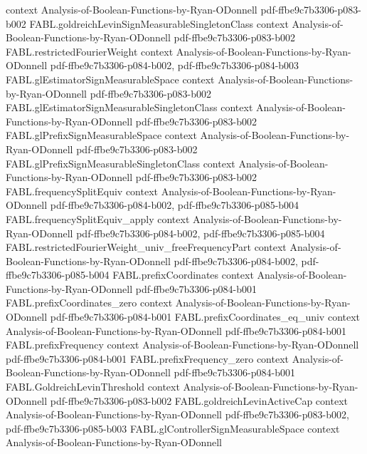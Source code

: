 \begin{theorem}
  {context}
  {Analysis-of-Boolean-Functions-by-Ryan-ODonnell}
  {pdf-ffbe9c7b3306-p083-b002}
\proofstep
  {FABL.goldreichLevinSignMeasurableSingletonClass}
  {context}
  {Analysis-of-Boolean-Functions-by-Ryan-ODonnell}
  {pdf-ffbe9c7b3306-p083-b002}
\proofstep
  {FABL.restrictedFourierWeight}
  {context}
  {Analysis-of-Boolean-Functions-by-Ryan-ODonnell}
  {pdf-ffbe9c7b3306-p084-b002,
    pdf-ffbe9c7b3306-p084-b003}
\proofstep
  {FABL.glEstimatorSignMeasurableSpace}
  {context}
  {Analysis-of-Boolean-Functions-by-Ryan-ODonnell}
  {pdf-ffbe9c7b3306-p083-b002}
\proofstep
  {FABL.glEstimatorSignMeasurableSingletonClass}
  {context}
  {Analysis-of-Boolean-Functions-by-Ryan-ODonnell}
  {pdf-ffbe9c7b3306-p083-b002}
\proofstep
  {FABL.glPrefixSignMeasurableSpace}
  {context}
  {Analysis-of-Boolean-Functions-by-Ryan-ODonnell}
  {pdf-ffbe9c7b3306-p083-b002}
\proofstep
  {FABL.glPrefixSignMeasurableSingletonClass}
  {context}
  {Analysis-of-Boolean-Functions-by-Ryan-ODonnell}
  {pdf-ffbe9c7b3306-p083-b002}
\proofstep
  {FABL.frequencySplitEquiv}
  {context}
  {Analysis-of-Boolean-Functions-by-Ryan-ODonnell}
  {pdf-ffbe9c7b3306-p084-b002,
    pdf-ffbe9c7b3306-p085-b004}
\proofstep
  {FABL.frequencySplitEquiv_apply}
  {context}
  {Analysis-of-Boolean-Functions-by-Ryan-ODonnell}
  {pdf-ffbe9c7b3306-p084-b002,
    pdf-ffbe9c7b3306-p085-b004}
\proofstep
  {FABL.restrictedFourierWeight_univ_freeFrequencyPart}
  {context}
  {Analysis-of-Boolean-Functions-by-Ryan-ODonnell}
  {pdf-ffbe9c7b3306-p084-b002,
    pdf-ffbe9c7b3306-p085-b004}
\proofstep
  {FABL.prefixCoordinates}
  {context}
  {Analysis-of-Boolean-Functions-by-Ryan-ODonnell}
  {pdf-ffbe9c7b3306-p084-b001}
\proofstep
  {FABL.prefixCoordinates_zero}
  {context}
  {Analysis-of-Boolean-Functions-by-Ryan-ODonnell}
  {pdf-ffbe9c7b3306-p084-b001}
\proofstep
  {FABL.prefixCoordinates_eq_univ}
  {context}
  {Analysis-of-Boolean-Functions-by-Ryan-ODonnell}
  {pdf-ffbe9c7b3306-p084-b001}
\proofstep
  {FABL.prefixFrequency}
  {context}
  {Analysis-of-Boolean-Functions-by-Ryan-ODonnell}
  {pdf-ffbe9c7b3306-p084-b001}
\proofstep
  {FABL.prefixFrequency_zero}
  {context}
  {Analysis-of-Boolean-Functions-by-Ryan-ODonnell}
  {pdf-ffbe9c7b3306-p084-b001}
\proofstep
  {FABL.GoldreichLevinThreshold}
  {context}
  {Analysis-of-Boolean-Functions-by-Ryan-ODonnell}
  {pdf-ffbe9c7b3306-p083-b002}
\proofstep
  {FABL.goldreichLevinActiveCap}
  {context}
  {Analysis-of-Boolean-Functions-by-Ryan-ODonnell}
  {pdf-ffbe9c7b3306-p083-b002,
    pdf-ffbe9c7b3306-p085-b003}
\proofstep
  {FABL.glControllerSignMeasurableSpace}
  {context}
  {Analysis-of-Boolean-Functions-by-Ryan-ODonnell}

\end{theorem}
